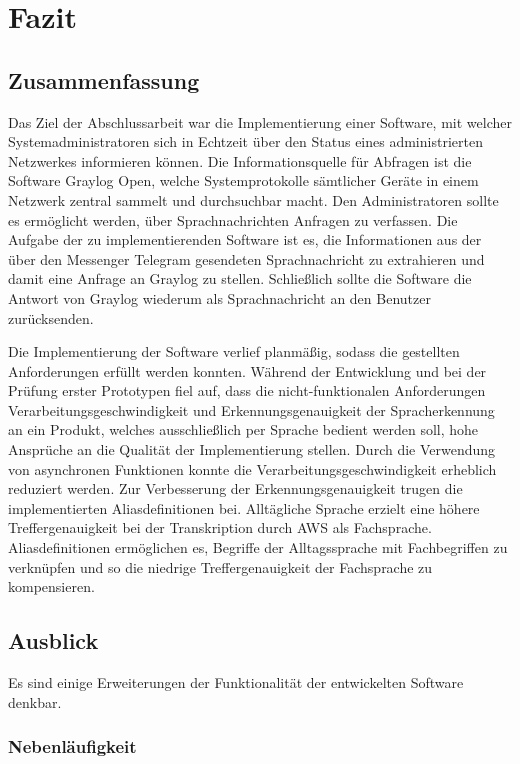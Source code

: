 \chapter{Fazit}
\label{cha:fazit}

\section{Zusammenfassung}

Das Ziel der Abschlussarbeit war die Implementierung einer Software, mit welcher Systemadministratoren sich in Echtzeit über den Status eines administrierten Netzwerkes informieren können. Die Informationsquelle für Abfragen ist die Software Graylog Open, welche Systemprotokolle sämtlicher Geräte in einem Netzwerk zentral sammelt und durchsuchbar macht. Den Administratoren sollte es ermöglicht werden, über Sprachnachrichten Anfragen zu verfassen. Die Aufgabe der zu implementierenden Software ist es, die Informationen aus der über den Messenger Telegram gesendeten Sprachnachricht zu extrahieren und damit eine Anfrage an Graylog zu stellen. Schließlich sollte die Software die Antwort von Graylog wiederum als Sprachnachricht an den Benutzer zurücksenden. 

Die Implementierung der Software verlief planmäßig, sodass die gestellten Anforderungen erfüllt werden konnten. Während der Entwicklung und bei der Prüfung erster Prototypen fiel auf, dass die nicht-funktionalen Anforderungen Verarbeitungsgeschwindigkeit und Erkennungsgenauigkeit der Spracherkennung an ein Produkt, welches ausschließlich per Sprache bedient werden soll, hohe Ansprüche an die Qualität der Implementierung stellen. Durch die Verwendung von asynchronen Funktionen konnte die Verarbeitungsgeschwindigkeit erheblich reduziert werden. Zur Verbesserung der Erkennungsgenauigkeit trugen die implementierten Aliasdefinitionen bei. Alltägliche Sprache erzielt eine höhere Treffergenauigkeit bei der Transkription durch AWS als Fachsprache. Aliasdefinitionen ermöglichen es, Begriffe der Alltagssprache mit Fachbegriffen zu verknüpfen und so die niedrige Treffergenauigkeit der Fachsprache zu kompensieren.

\section{Ausblick}

Es sind einige Erweiterungen der Funktionalität der entwickelten Software denkbar. 

\subsection{Nebenläufigkeit}

